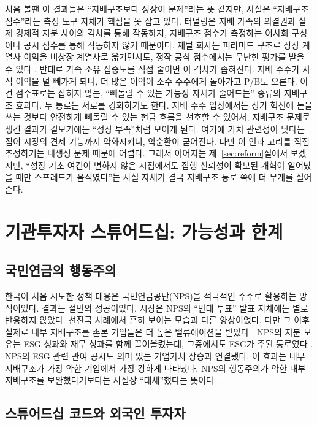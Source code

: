 \documentclass[12pt]{article}
\begin{document}
처음 볼땐 이 결과들은 ``지배구조보다 성장이 문제''라는 뜻 같지만, 사실은 ``지배구조 점수''라는 측정 도구 자체가 핵심을 못 잡고 있다. 터널링은 지배 가족의 의결권과 실제 경제적 지분 사이의 격차를 통해 작동하지, 지배구조 점수가 측정하는 이사회 구성이나 공시 점수를 통해 작동하지 않기 때문이다. 재벌 회사는 피라미드 구조로 상장 계열사 이익을 비상장 계열사로 옮기면서도, 정작 공식 점수에서는 무난한 평가를 받을 수 있다 \citep{almeida2011chaebol}. 반대로 가족 소유 집중도를 직접 줄이면 이 격차가 좁혀진다. 지배 주주가 사적 이익을 덜 빼가게 되니, 더 많은 이익이 소수 주주에게 돌아가고 P/B도 오른다. 이건 점수표로는 잡히지 않는, ``빼돌릴 수 있는 가능성 자체가 줄어드는'' 종류의 지배구조 효과다. 두 통로는 서로를 강화하기도 한다. 지배 주주 입장에서는 장기 혁신에 돈을 쓰는 것보다 안전하게 빼돌릴 수 있는 현금 흐름을 선호할 수 있어서, 지배구조 문제로 생긴 결과가 겉보기에는 ``성장 부족''처럼 보이게 된다. 여기에 가치 관련성이 낮다는 점이 시장의 견제 기능까지 약화시키니, 악순환이 굳어진다. 다만 이 인과 고리를 직접 추정하기는 내생성 문제 때문에 어렵다. 그래서 이어지는 제~\ref{sec:reform}절에서 보겠지만, ``성장 기초 여건이 변하지 않은 시점에서도 집행 신뢰성이 확보된 개혁이 일어났을 때만 스프레드가 움직였다''는 사실 자체가 결국 지배구조 통로 쪽에 더 무게를 실어준다.

\section{기관투자자 스튜어드십: 가능성과 한계}
\label{sec:stewardship}

\subsection{국민연금의 행동주의}

한국이 처음 시도한 정책 대응은 국민연금공단(NPS)을 적극적인 주주로 활용하는 방식이었다. 결과는 절반의 성공이었다. 시장은 NPS의 ``반대 투표'' 발표 자체에는 별로 반응하지 않았다. 선진국 사례에서 흔히 보이는 모습과 다른 양상이었다. 다만 그 이후 실제로 내부 지배구조를 손본 기업들은 더 높은 밸류에이션을 받았다 \citep{kim2014nps}. NPS의 지분 보유는 ESG 성과와 재무 성과를 함께 끌어올렸는데, 그중에서도 ESG가 주된 통로였다 \citep{kim2022nps_esg}. NPS의 ESG 관련 관여 공시도 의미 있는 기업가치 상승과 연결됐다. 이 효과는 내부 지배구조가 가장 약한 기업에서 가장 강하게 나타났다.  NPS의 행동주의가 약한 내부 지배구조를 보완했다기보다는 사실상 ``대체''했다는 뜻이다 \citep{lee2026esg}.

\subsection{스튜어드십 코드와 외국인 투자자}
\end{document}
